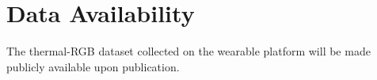 \documentclass[conference,a4paper]{IEEEtran}
\begin{document}




%
\IEEEpeerreviewmaketitle













\section*{Data Availability}
The thermal-RGB dataset collected on the wearable platform will be made
publicly available upon publication.







\end{document}
